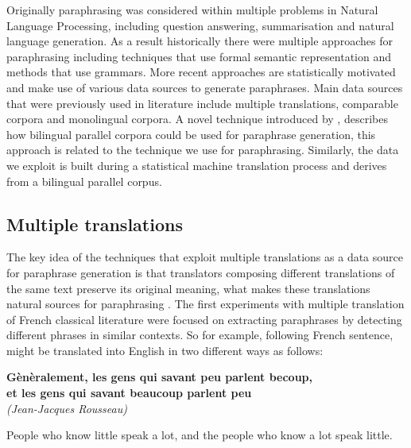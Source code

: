 Originally paraphrasing was considered within multiple problems in Natural Language Processing, including question answering, summarisation and natural language generation. As a result historically there were multiple approaches for paraphrasing including techniques that use formal semantic representation and methods that use grammars. More recent approaches are statistically motivated and make use of various data sources to generate paraphrases. 
Main data sources that were previously used in literature include multiple translations, comparable corpora and monolingual corpora. A novel technique introduced by \cite{Callison-Burch2007}, describes how bilingual parallel corpora could be used for paraphrase generation, this approach is related to the technique we use for paraphrasing. Similarly, the data we exploit is built during a statistical machine translation process and derives from a bilingual parallel corpus.

\subsection{Multiple translations}

The key idea of the techniques that exploit multiple translations as a data source for paraphrase generation is that translators composing different translations of the same text preserve its original meaning, what makes these translations natural sources for paraphrasing \citep{barzilay2001extracting}. The first experiments with multiple translation of French classical literature were focused on extracting paraphrases by detecting different phrases in similar contexts. So for example, following French sentence, might be translated into English in two different ways as follows:

\begin{center}
\begin{Large}
\textbf{G\`{e}n\`{e}ralement, les gens qui savant peu parlent becoup,\\ et les gens qui savant beaucoup parlent peu}
\\
\small{\textit{(Jean-Jacques Rousseau)}}
\end{Large}
\end{center}

\begin{center}
\begin{Large}
People who know little speak a lot, and the people who know a lot speak little. 
\end{Large}
\end{center}

